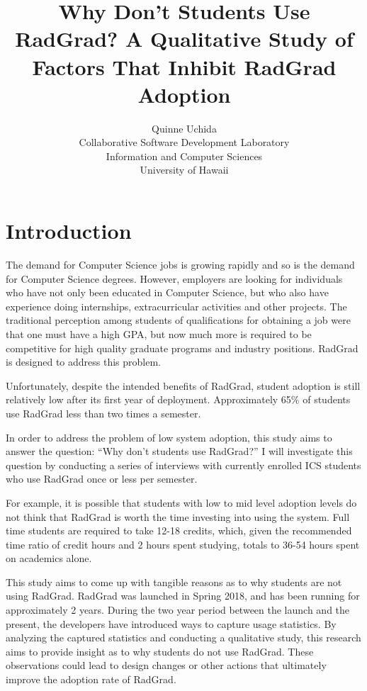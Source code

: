 \documentclass[english]{proposalnsf}
\title{Why Don't Students Use RadGrad? A Qualitative Study of Factors That Inhibit RadGrad Adoption}
\author{Quinne Uchida \\Collaborative Software Development Laboratory \\ Information and Computer Sciences \\ University of Hawaii}
\begin{document}
\maketitle
\newpage

\section{Introduction}
\label{introduction}

The demand for Computer Science jobs is growing rapidly and so is the demand for Computer Science degrees. However, employers are looking for individuals who have not only  been educated in Computer Science, but who also have experience doing internships, extracurricular activities and other projects. The traditional perception among students of qualifications for obtaining a job were that one must have a high GPA, but now much more is required to be competitive for high quality graduate programs and industry positions. RadGrad is designed to address this problem. 

Unfortunately, despite the intended benefits of RadGrad, student adoption is still relatively low after its first year of deployment. Approximately 65{\%} of students use RadGrad less than two times a semester. 

In order to address the problem of low system adoption, this study aims to answer the question: ``Why don't students use RadGrad?'' I will investigate this question by conducting a series of interviews with currently enrolled ICS students who use RadGrad once or less per semester. 

For example, it is possible that students with low to mid level adoption levels do not think that RadGrad is worth the time investing into using the system. 
Full time students are required to take 12-18 credits, which, given the recommended time ratio of credit hours and 2 hours spent studying, totals to 36-54 hours spent on academics alone. 

This study aims to come up with tangible reasons as to why students are not using RadGrad. RadGrad was launched in Spring 2018, and has been running for approximately 2 years. During the two year period between the launch and the present, the developers have introduced ways to capture usage statistics. By analyzing the captured statistics and conducting a qualitative study, this research aims to provide insight as to why students do not use RadGrad. These observations could lead to design changes or other actions that ultimately improve the adoption rate of RadGrad.  
\end{document}
